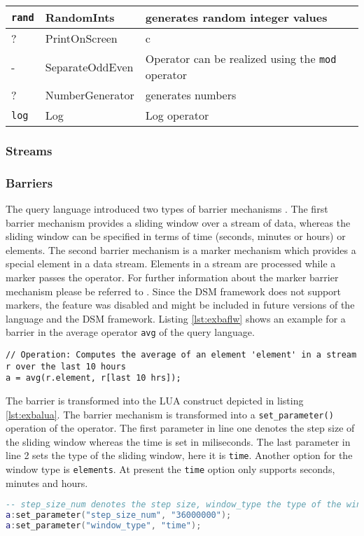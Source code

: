 \begin{center}
\begin{tabular}{|l|l|l|l|}
  \hline
  \texttt{rand} & RandomInts & generates random integer values \\
  \hline
  ? & PrintOnScreen & c \\
  \hline  
  - & SeparateOddEven & Operator can be realized using the \texttt{mod} operator \\
  \hline  
  ? & NumberGenerator & generates numbers \\
  \hline  
  \texttt{log} & Log & Log operator \\
  \hline
  \end{tabular}
  \label{tab:overview}
\end{center}

\subsubsection{Streams}
\subsubsection{Barriers}
The query language introduced two types of barrier mechanisms 
\cite{297:Frey2010}. The first barrier mechanism provides a sliding window over
a stream of data, whereas the sliding window can be specified in terms of time
(seconds, minutes or hours) or elements. The second barrier mechanism is a 
marker mechanism which provides a special element in a data stream. Elements 
in a stream are processed while a marker passes the operator. For further 
information about the marker barrier mechanism please be referred to 
\cite{297:Frey2010}. Since the DSM framework does not support markers, the 
feature was disabled and might be included in future versions of the language 
and the DSM framework. Listing \ref{lst:exbaflw} shows an example for a barrier
in the average operator \texttt{avg} of the query language.
\begin{lstlisting}[language=Flow, caption={\emph{Example of Barrier Mechanism in Flow}},label={lst:exbaflw}]
// Operation: Computes the average of an element 'element' in a stream r over the last 10 hours
a = avg(r.element, r[last 10 hrs]);
\end{lstlisting}
The barrier is transformed into the LUA construct depicted in listing 
\ref{lst:exbalua}. The barrier mechanism is transformed into a 
\texttt{set\_parameter()} operation of the operator. The first parameter in line
one denotes the step size of the sliding window whereas the time is set in 
miliseconds. The last parameter in line 2 sets the type of the sliding window,
here it is \texttt{time}. Another option for the window type is 
\texttt{elements}. At present the \texttt{time} option only supports seconds,
minutes and hours. 
\begin{lstlisting}[language=Lua, caption={\emph{Example of Barrier Mechanism in LUA}},label={lst:exbalua}]
-- step_size_num denotes the step size, window_type the type of the window
a:set_parameter("step_size_num", "36000000");
a:set_parameter("window_type", "time");
\end{lstlisting}

